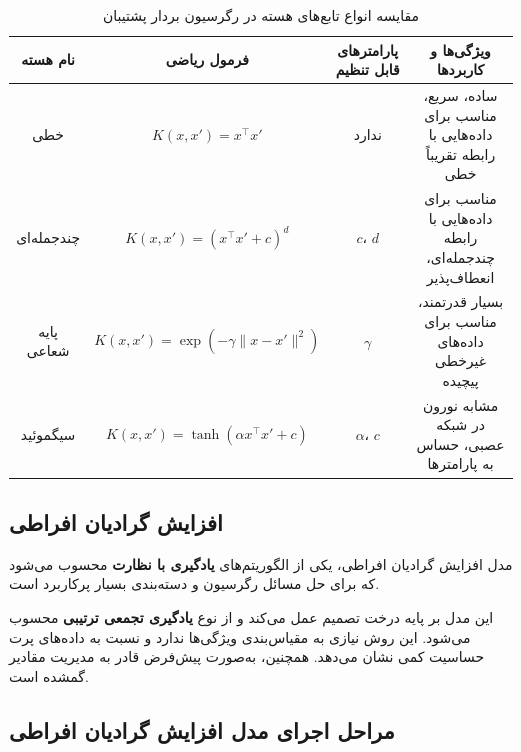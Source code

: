 \begin{table}[H]
	\centering
	\caption{مقایسه انواع تابع‌های هسته در رگرسیون بردار پشتیبان}
	\label{tab:kernels}
		\begin{tabular}{|c|c|c|c|}
			\hline
			\textbf{نام هسته} & \textbf{فرمول ریاضی} & \textbf{پارامترهای قابل تنظیم} & \textbf{ویژگی‌ها و کاربردها} \\
			\hline
			خطی & $K(x,x') = x^\top x'$ & ندارد & ساده، سریع، مناسب برای داده‌هایی با رابطه تقریباً خطی \\
			\hline
			چندجمله‌ای & $K(x,x') = (x^\top x' + c)^d$ & $c$، $d$ & مناسب برای داده‌هایی با رابطه چندجمله‌ای، انعطاف‌پذیر \\
			\hline
			پایه شعاعی & $K(x,x') = \exp(-\gamma \|x - x'\|^2)$ & $\gamma$ & بسیار قدرتمند، مناسب برای داده‌های غیرخطی پیچیده \\
			\hline
			سیگموئید & $K(x,x') = \tanh(\alpha x^\top x' + c)$ & $\alpha$، $c$ & مشابه نورون در شبکه عصبی، حساس به پارامترها \\
			\hline
		\end{tabular}
\end{table}




\subsection[افزایش گرادیان افراطی]{افزایش گرادیان افراطی}

مدل افزایش گرادیان افراطی، یکی از الگوریتم‌های \textbf{یادگیری با نظارت} محسوب می‌شود که برای حل مسائل رگرسیون و دسته‌بندی بسیار پرکاربرد است. 

این مدل بر پایه درخت تصمیم عمل می‌کند و از نوع \textbf{یادگیری تجمعی ترتیبی} محسوب می‌شود. این روش نیازی به مقیاس‌بندی ویژگی‌ها ندارد و نسبت به داده‌های پرت حساسیت کمی نشان می‌دهد. همچنین، به‌صورت پیش‌فرض قادر به مدیریت مقادیر گمشده است.

\subsection*{مراحل اجرای مدل افزایش گرادیان افراطی}

